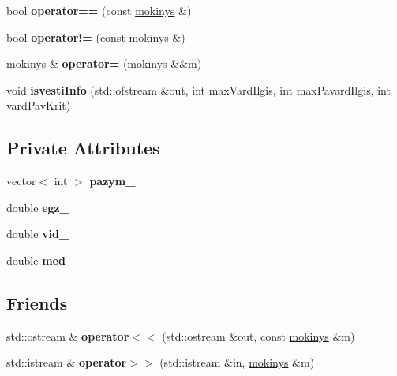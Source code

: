 \begin{DoxyCompactItemize}
bool {\bfseries operator==} (const \mbox{\hyperlink{classmokinys}{mokinys}} \&)
\item 
\mbox{\label{classmokinys_afa673f3503ec6ab0109d6b255e7f1446}} 
bool {\bfseries operator!=} (const \mbox{\hyperlink{classmokinys}{mokinys}} \&)
\item 
\mbox{\label{classmokinys_ad121d556b0db6b3ea6fc5d0b6ec2d553}} 
\mbox{\hyperlink{classmokinys}{mokinys}} \& {\bfseries operator=} (\mbox{\hyperlink{classmokinys}{mokinys}} \&\&m)
\item 
\mbox{\label{classmokinys_a0ef6f65300dbd3ff3c2c7825ab5969be}} 
void {\bfseries isvesti\+Info} (std\+::ofstream \&out, int max\+Vard\+Ilgis, int max\+Pavard\+Ilgis, int vard\+Pav\+Krit)
\end{DoxyCompactItemize}
\subsection*{Private Attributes}
\begin{DoxyCompactItemize}
\item 
\mbox{\label{classmokinys_ae929ad2d185935d5db73b2d64ec7ffcc}} 
vector$<$ int $>$ {\bfseries pazym\+\_\+}
\item 
\mbox{\label{classmokinys_a42d07f49d100194d80f71bbe87318ac3}} 
double {\bfseries egz\+\_\+}
\item 
\mbox{\label{classmokinys_af7fb703a54ae985b06539ebce0ef2eda}} 
double {\bfseries vid\+\_\+}
\item 
\mbox{\label{classmokinys_a82e9cb15047d46bde1d092e1f2dab9a7}} 
double {\bfseries med\+\_\+}
\end{DoxyCompactItemize}
\subsection*{Friends}
\begin{DoxyCompactItemize}
\item 
\mbox{\label{classmokinys_a9e61082b53f923864a0248cbf30ac08e}} 
std\+::ostream \& {\bfseries operator$<$$<$} (std\+::ostream \&out, const \mbox{\hyperlink{classmokinys}{mokinys}} \&m)
\item 
\mbox{\label{classmokinys_a495009c12a1502da76cf2afee838a3e1}} 
std\+::istream \& {\bfseries operator$>$$>$} (std\+::istream \&in, \mbox{\hyperlink{classmokinys}{mokinys}} \&m)
\end{DoxyCompactItemize}
